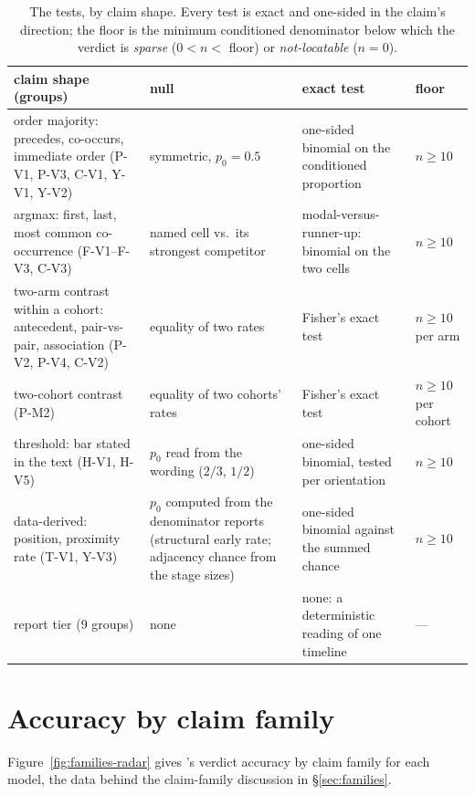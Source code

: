 \begin{table}[htbp]
\centering
\scriptsize
\setlength{\tabcolsep}{3pt}
\renewcommand{\arraystretch}{1.15}
\begin{tabularx}{\columnwidth}{@{}p{2.25cm} Y Y p{1.05cm}@{}}
\toprule
claim shape (groups) & null & exact test & floor \\
\midrule
order majority: precedes, co-occurs, immediate order (P-V1, P-V3, C-V1, Y-V1, Y-V2) & symmetric, $p_0 = 0.5$ & one-sided binomial on the conditioned proportion & $n \geq 10$ \\
argmax: first, last, most common co-occurrence (F-V1--F-V3, C-V3) & named cell vs.\ its strongest competitor & modal-versus-runner-up: binomial on the two cells & $n \geq 10$ \\
two-arm contrast within a cohort: antecedent, pair-vs-pair, association (P-V2, P-V4, C-V2) & equality of two rates & Fisher's exact test & $n \geq 10$ per arm \\
two-cohort contrast (P-M2) & equality of two cohorts' rates & Fisher's exact test & $n \geq 10$ per cohort \\
threshold: bar stated in the text (H-V1, H-V5) & $p_0$ read from the wording ($2/3$, $1/2$) & one-sided binomial, tested per orientation & $n \geq 10$ \\
data-derived: position, proximity rate (T-V1, Y-V3) & $p_0$ computed from the denominator reports (structural early rate; adjacency chance from the stage sizes) & one-sided binomial against the summed chance & $n \geq 10$ \\
report tier (9 groups) & none & none: a deterministic reading of one timeline & --- \\
\bottomrule
\end{tabularx}
\caption{The tests, by claim shape. Every test is exact and one-sided in the
claim's direction; the floor is the minimum conditioned denominator below
which the verdict is \emph{sparse} ($0 < n <$ floor) or \emph{not-locatable}
($n = 0$).}
\label{tab:tests}
\end{table}
\fi

\section{Accuracy by claim family}
\label{app:families-radar}

Figure~\ref{fig:families-radar} gives \art{}'s verdict accuracy by claim
family for each model, the data behind the claim-family discussion in
\S\ref{sec:families}.

